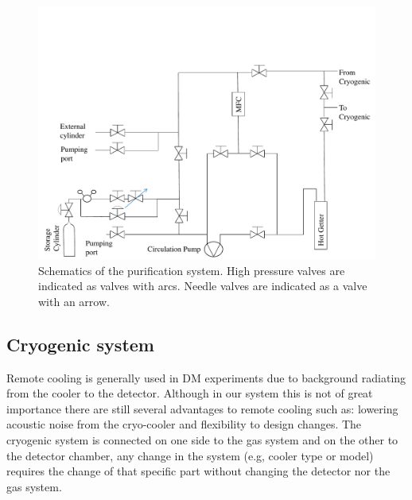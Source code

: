 \begin{figure}[t!]
\centerline{\includegraphics[width=1.\linewidth]{GasSchematics.pdf}}
\caption{Schematics of the purification system. High pressure valves are indicated as valves with arcs. Needle valves are indicated as 
a valve with an arrow.}
\label{fig:gasSchematic}
\end{figure}

\subsection{Cryogenic system}
\label{subsec:cryo}

Remote cooling is generally used in DM experiments due to background radiating from the cooler to the detector. Although in our system this is not of great importance there are still several advantages to remote cooling such as: lowering acoustic noise from the cryo-cooler and flexibility to design changes. The cryogenic system is connected on one side to the gas system and on the other to the detector chamber, any change in the system (e.g, cooler type or model) requires the change of that specific part without changing the detector nor the gas system.

